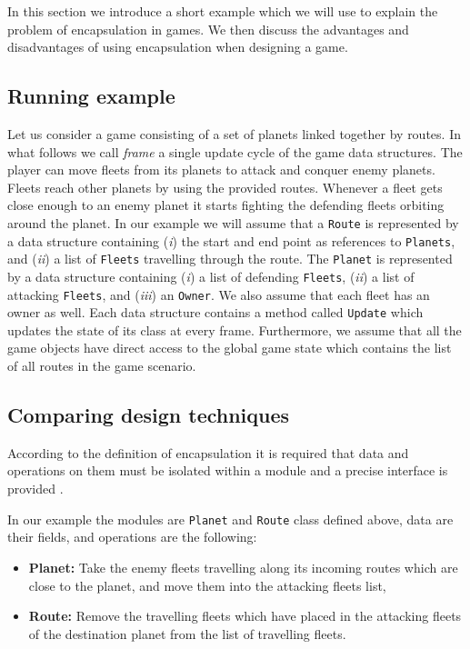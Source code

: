 In this section we introduce a short example which we will use to explain the problem of encapsulation in games. We then discuss the advantages and disadvantages of using encapsulation when designing a game.

\subsection{Running example}

Let us consider a game consisting of a set of planets linked together by routes. In what follows we call \textit{frame} a single update cycle of the game data structures. The player can move fleets from its planets to attack and conquer enemy planets. Fleets reach other planets by using the provided routes. Whenever a fleet gets close enough to an enemy planet it starts fighting the defending fleets orbiting around the planet. In our example we will assume that a \texttt{Route} is represented by a data structure containing (\textit{i}) the start and end point as references to \texttt{Planets}, and (\textit{ii}) a list of \texttt{Fleets} travelling through the route. The \texttt{Planet} is represented by a data structure containing (\textit{i}) a list of defending \texttt{Fleets}, (\textit{ii}) a list of attacking \texttt{Fleets}, and (\textit{iii}) an \texttt{Owner}. We also assume that each fleet has an owner as well. Each data structure contains a method called \texttt{Update} which updates the state of its class at every frame. Furthermore, we assume that all the game objects have direct access to the global game state which contains the list of all routes in the game scenario.

\subsection{Comparing design techniques}

According to the definition of encapsulation it is required that data and operations on them must be isolated within a module and a precise interface is provided \cite{ENCAPSULATION}. 

In our example the modules are \texttt{Planet} and \texttt{Route} class defined above, data are their fields, and operations are the following:

\begin{itemize}
	\item \textbf{Planet:} Take the enemy fleets travelling along its incoming routes which are close to the planet, and move them into the attacking fleets list,
	\item \textbf{Route:} Remove the travelling fleets which have placed in the attacking fleets of the destination planet from the list of travelling fleets.
\end{itemize}


